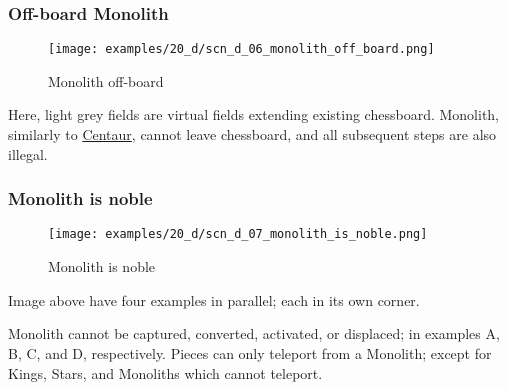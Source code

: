 \subsubsection*{Off-board Monolith}
\label{sec:Discovery/Monolith/Movement/Off-board Monolith}

\vspace*{-1.4\baselineskip}
\noindent
\begin{figure}[!h]
\texttt{[image: examples/20\_d/scn\_d\_06\_monolith\_off\_board.png]}
\vspace*{-1.3\baselineskip}
\caption{Monolith off-board}
\label{fig:scn_d_06_monolith_off_board}
\end{figure}

\vspace*{-0.4\baselineskip}
Here, light grey fields are virtual fields extending existing chessboard.
Monolith, similarly to \hyperref[fig:scn_hd_06_centaur_off_board]{Centaur},
cannot leave chessboard, and all subsequent steps are also illegal.

\clearpage %

\subsubsection*{Monolith is noble}
\label{sec:Discovery/Monolith/Movement/Monolith is noble}

\vspace*{-1.4\baselineskip}
\noindent
\begin{figure}[!h]
\texttt{[image: examples/20\_d/scn\_d\_07\_monolith\_is\_noble.png]}
\vspace*{-1.3\baselineskip}
\caption{Monolith is noble}
\label{fig:scn_d_07_monolith_is_noble}
\end{figure}

\vspace*{-0.4\baselineskip}
Image above have four examples in parallel; each in its own corner.

Monolith cannot be captured, converted, activated, or displaced; in examples
A, B, C, and D, respectively. \newline
\indent
Pieces can only teleport from a Monolith; except for Kings, Stars, and
Monoliths which cannot teleport.

\clearpage %

